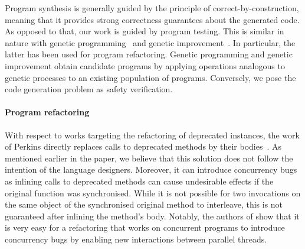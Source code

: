 \documentclass[sigconf,review,anonymous]{acmart}
\begin{document}



Program synthesis is generally guided by the principle of correct-by-construction, meaning that it provides strong correctness guarantees about the generated code.
As opposed to that, our work is guided by program testing. This is similar in nature with genetic programming~\cite{Koza92} and genetic improvement~\cite{DBLP:journals/dagstuhl-reports/PetkeGFL18,7911210}. In particular, the latter has been used for program refactoring. Genetic programming and genetic improvement obtain candidate programs by applying operations analogous to genetic processes to an existing population of programs. Conversely, we pose the code generation problem as safety verification.
%
%
\paragraph{Program refactoring}

With respect to works targeting the refactoring of deprecated instances, the work of Perkins directly replaces calls to deprecated methods by their bodies~\cite{DBLP:conf/paste/Perkins05}.
As mentioned earlier in the paper, we believe that this solution does not follow the intention of the language designers. Moreover, it can
introduce concurrency bugs as inlining calls to deprecated
methods can cause undesirable effects if the original function was
synchronised.  While it is not possible for two invocations on the
same object of the synchronised original method to interleave, this is
not guaranteed after inlining the method's body. Notably, the authors of \cite{10.1007/978-3-642-14107-2_11}
show that it is very easy for a refactoring that works on concurrent
programs to introduce concurrency bugs by enabling new interactions between
parallel threads. %
\end{document}
